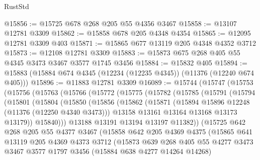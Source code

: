 \begin{lexlean}{RustStd}
\begin{coremodule}
{\begin{coremodule}
{{{{{{{{{{{{{{{{{{{{{{{{{{{{{{{{{{{{{{{{{{{{{{{{{{{{{{{{{{{{{{{{{{{{{{{{{{{{{{{{{{{{{@15856 := @15725 @678 @268 @205 @55 @4356 @3467
@15858 := @13107 @12781 @3309
@15862 := @15858 @678 @205 @4348 @4354
@15865 := @12095 @12781 @3309 @403
@15871 := @15865 @677 @13119 @205 @4348 @4352 @3712
@15873 := @12108 @12781 @3309
@15883 := @15873 @675 @268 @405 @55 @4345 @3473 @3467 @3577 @1745 @3456
@15884 := @15832 @405
@15894 := @15883 (@15884 @674 @4345 (@12234 (@12235 @4345)) (@11376 (@12240 @674 @405)))
@15896 := @11883 @12781 @3309
@16089 := @15744
    (@15747
      (@15753
        (@15756
          (@15763
            (@15766
              (@15772
                (@15775
                  (@15782
                    (@15785
                      (@15791
                        (@15794
                          (@15801
                            (@15804
                              (@15850
                                (@15856
                                  (@15862
                                    (@15871
                                      (@15894 @15896 @12248 (@11376 (@12250 @4340 @3473)))
                                      @13158
                                      @13161
                                      @13164
                                      @13168
                                      @13173
                                      @13179))
                                  @15840)))
                            @13188
                            @13191
                            @13194
                            @13197
                            @11382))
                        (@15725
                          @642
                          @268
                          @205
                          @55
                          @4377
                          @3467
                          (@15858
                            @642
                            @205
                            @4369
                            @4375
                            (@15865
                              @641
                              @13119
                              @205
                              @4369
                              @4373
                              @3712
                              (@15873
                                @639
                                @268
                                @405
                                @55
                                @4277
                                @3473
                                @3467
                                @3577
                                @1797
                                @3456
                                (@15884 @638 @4277 @14264 @14268)
}}}}}}}}}}}}}}}}}}}}}}}}}}}}}}}}}}}}}}}}}}}}}}}}}}}}}}}}}}}}}}}}}}}}}}}}}}}}}}}}}}}}}
\end{coremodule}}
\end{coremodule}
\end{lexlean}

